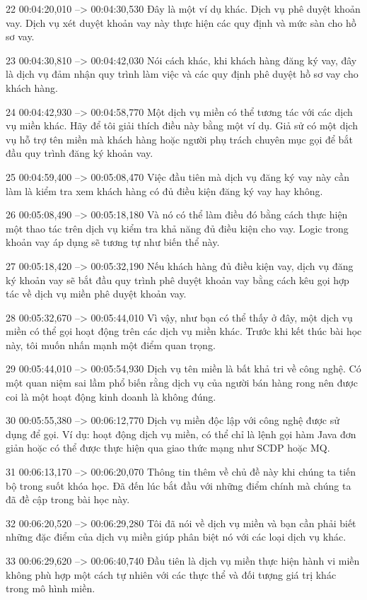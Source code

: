 22
00:04:20,010 --> 00:04:30,530
Đây là một ví dụ khác.  Dịch vụ phê duyệt khoản vay.  Dịch vụ xét duyệt khoản vay này thực hiện các quy định và mức sàn cho hồ sơ vay.

23
00:04:30,810 --> 00:04:42,030
Nói cách khác, khi khách hàng đăng ký vay, đây là dịch vụ đảm nhận quy trình làm việc và các quy định phê duyệt hồ sơ vay cho khách hàng.

24
00:04:42,930 --> 00:04:58,770
Một dịch vụ miền có thể tương tác với các dịch vụ miền khác.  Hãy để tôi giải thích điều này bằng một ví dụ.  Giả sử có một dịch vụ hỗ trợ tên miền mà khách hàng hoặc người phụ trách chuyên mục gọi để bắt đầu quy trình đăng ký khoản vay.

25
00:04:59,400 --> 00:05:08,470
Việc đầu tiên mà dịch vụ đăng ký vay này cần làm là kiểm tra xem khách hàng có đủ điều kiện đăng ký vay hay không.

26
00:05:08,490 --> 00:05:18,180
Và nó có thể làm điều đó bằng cách thực hiện một thao tác trên dịch vụ kiểm tra khả năng đủ điều kiện cho vay.  Logic trong khoản vay áp dụng sẽ tương tự như biến thể này.

27
00:05:18,420 --> 00:05:32,190
Nếu khách hàng đủ điều kiện vay, dịch vụ đăng ký khoản vay sẽ bắt đầu quy trình phê duyệt khoản vay bằng cách kêu gọi hợp tác về dịch vụ miền phê duyệt khoản vay.

28
00:05:32,670 --> 00:05:44,010
Vì vậy, như bạn có thể thấy ở đây, một dịch vụ miền có thể gọi hoạt động trên các dịch vụ miền khác.  Trước khi kết thúc bài học này, tôi muốn nhấn mạnh một điểm quan trọng.

29
00:05:44,010 --> 00:05:54,930
Dịch vụ tên miền là bất khả tri về công nghệ.  Có một quan niệm sai lầm phổ biến rằng dịch vụ của người bán hàng rong nên được coi là một hoạt động kinh doanh là không đúng.

30
00:05:55,380 --> 00:06:12,770
Dịch vụ miền độc lập với công nghệ được sử dụng để gọi.  Ví dụ: hoạt động dịch vụ miền, có thể chỉ là lệnh gọi hàm Java đơn giản hoặc có thể được thực hiện qua giao thức mạng như SCDP hoặc MQ.

31
00:06:13,170 --> 00:06:20,070
Thông tin thêm về chủ đề này khi chúng ta tiến bộ trong suốt khóa học.  Đã đến lúc bắt đầu với những điểm chính mà chúng ta đã đề cập trong bài học này.

32
00:06:20,520 --> 00:06:29,280
Tôi đã nói về dịch vụ miền và bạn cần phải biết những đặc điểm của dịch vụ miền giúp phân biệt nó với các loại dịch vụ khác.

33
00:06:29,620 --> 00:06:40,740
Đầu tiên là dịch vụ miền thực hiện hành vi miền không phù hợp một cách tự nhiên với các thực thể và đối tượng giá trị khác trong mô hình miền.

